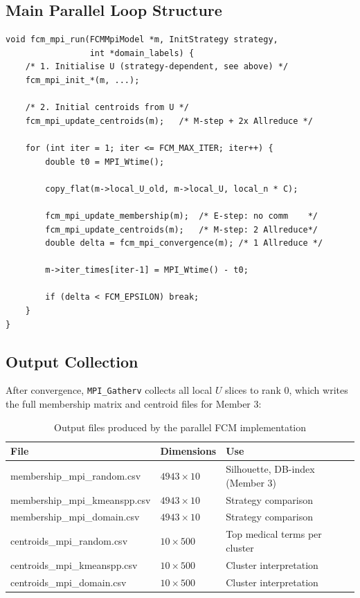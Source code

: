 \documentclass[12pt,a4paper]{article}
\begin{document}
\subsection{Main Parallel Loop Structure}

\begin{lstlisting}[style=cstyle, caption={Main parallel FCM loop with timing instrumentation}]
void fcm_mpi_run(FCMMpiModel *m, InitStrategy strategy,
                 int *domain_labels) {
    /* 1. Initialise U (strategy-dependent, see above) */
    fcm_mpi_init_*(m, ...);

    /* 2. Initial centroids from U */
    fcm_mpi_update_centroids(m);   /* M-step + 2x Allreduce */

    for (int iter = 1; iter <= FCM_MAX_ITER; iter++) {
        double t0 = MPI_Wtime();

        copy_flat(m->local_U_old, m->local_U, local_n * C);

        fcm_mpi_update_membership(m);  /* E-step: no comm    */
        fcm_mpi_update_centroids(m);   /* M-step: 2 Allreduce*/
        double delta = fcm_mpi_convergence(m); /* 1 Allreduce */

        m->iter_times[iter-1] = MPI_Wtime() - t0;

        if (delta < FCM_EPSILON) break;
    }
}
\end{lstlisting}

\subsection{Output Collection}

After convergence, \texttt{MPI\_Gatherv} collects all local $U$ slices to rank 0, which writes the full membership matrix and centroid files for Member 3:

\begin{table}[H]
\centering
\begin{tabularx}{\textwidth}{>{\ttfamily}l l X}
\toprule
\textbf{File} & \textbf{Dimensions} & \textbf{Use} \\
\midrule
membership\_mpi\_random.csv   & $4943 \times 10$ & Silhouette, DB-index (Member 3) \\
membership\_mpi\_kmeanspp.csv & $4943 \times 10$ & Strategy comparison \\
membership\_mpi\_domain.csv   & $4943 \times 10$ & Strategy comparison \\
centroids\_mpi\_random.csv    & $10 \times 500$  & Top medical terms per cluster \\
centroids\_mpi\_kmeanspp.csv  & $10 \times 500$  & Cluster interpretation \\
centroids\_mpi\_domain.csv    & $10 \times 500$  & Cluster interpretation \\
\bottomrule
\end{tabularx}
\caption{Output files produced by the parallel FCM implementation}
\end{table}
\end{document}
